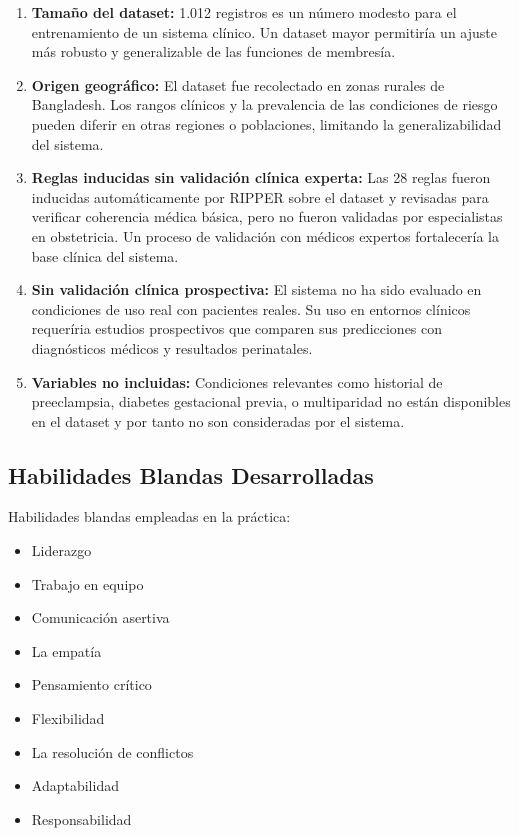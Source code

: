 \documentclass[11pt]{article}
\begin{document}
\begin{enumerate}
    \item \textbf{Tama\~no del dataset:} 1.012 registros es un n\'umero modesto para el entrenamiento de un sistema cl\'inico. Un dataset mayor permitir\'ia un ajuste m\'as robusto y generalizable de las funciones de membres\'ia.

    \item \textbf{Origen geogr\'afico:} El dataset fue recolectado en zonas rurales de Bangladesh. Los rangos cl\'inicos y la prevalencia de las condiciones de riesgo pueden diferir en otras regiones o poblaciones, limitando la generalizabilidad del sistema.

    \item \textbf{Reglas inducidas sin validaci\'on cl\'inica experta:} Las 28 reglas fueron inducidas autom\'aticamente por RIPPER sobre el dataset y revisadas para verificar coherencia m\'edica b\'asica, pero no fueron validadas por especialistas en obstetricia. Un proceso de validaci\'on con m\'edicos expertos fortalecer\'ia la base cl\'inica del sistema.

    \item \textbf{Sin validaci\'on cl\'inica prospectiva:} El sistema no ha sido evaluado en condiciones de uso real con pacientes reales. Su uso en entornos cl\'inicos requer\'iria estudios prospectivos que comparen sus predicciones con diagn\'osticos m\'edicos y resultados perinatales.

    \item \textbf{Variables no incluidas:} Condiciones relevantes como historial de preeclampsia, diabetes gestacional previa, o multiparidad no est\'an disponibles en el dataset y por tanto no son consideradas por el sistema.
\end{enumerate}



\subsection{Habilidades Blandas Desarrolladas}

Habilidades blandas empleadas en la pr\'actica:

\begin{itemize}[label=$\square$]
    \item[$\boxtimes$] Liderazgo
    \item[$\boxtimes$] Trabajo en equipo
    \item Comunicaci\'on asertiva
    \item La empat\'ia
    \item Pensamiento cr\'itico
    \item Flexibilidad
    \item La resoluci\'on de conflictos
    \item Adaptabilidad
    \item[$\boxtimes$] Responsabilidad
\end{itemize}
\end{document}

